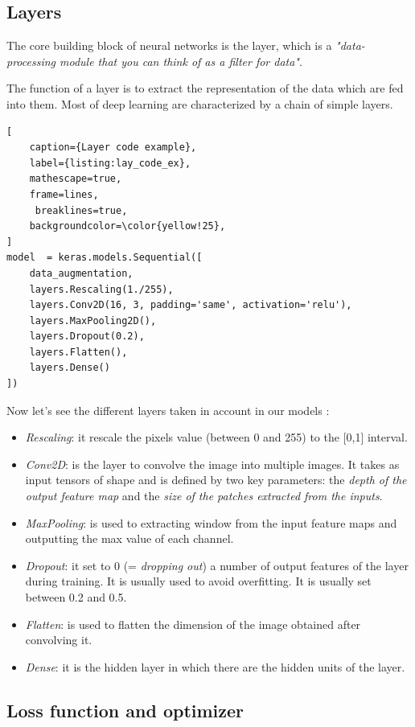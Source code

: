\documentclass[a4paper,12pt]{article}
\begin{document}
\subsection{Layers}

The core building block of neural networks is the layer, which is a \textit{"data-processing module that you can think of as a filter for data"}\supercite{nnlbook}.

The function of a layer is to extract the representation of the data which are fed into them. 
Most of deep learning are characterized by a chain of simple layers.

\begin{lstlisting}[
    caption={Layer code example},
    label={listing:lay_code_ex},
    mathescape=true, 
    frame=lines,
     breaklines=true,
    backgroundcolor=\color{yellow!25},
]
model  = keras.models.Sequential([
    data_augmentation,
    layers.Rescaling(1./255),
    layers.Conv2D(16, 3, padding='same', activation='relu'),
    layers.MaxPooling2D(),
    layers.Dropout(0.2),
    layers.Flatten(),
    layers.Dense()
])
\end{lstlisting}

Now let's see the different layers taken in account in our models :
\begin{itemize}
    \item\textit{Rescaling}: it rescale the pixels value (between 0 and 255) to the [0,1] interval. 
    \item\textit{Conv2D}: is the layer to convolve the image into multiple images. It takes as input tensors of shape and is defined by two key parameters: the \textit{depth of the output feature map} and the \textit{size of the patches extracted from the inputs}. 
    \item\textit{MaxPooling}: is used to extracting window from the input feature maps and outputting the max value of each channel.
    \item\textit{Dropout}: it set to 0 (= \textit{dropping out}) a number of output features of the layer during training. It is usually used to avoid overfitting. It is usually set between 0.2 and 0.5.
    \item\textit{Flatten}: is used to flatten the dimension of the image obtained after convolving it.
    \item\textit{Dense}: it is the hidden layer in which there are the hidden units of the layer.
\end{itemize}

\subsection{Loss function and optimizer}
\end{document}
